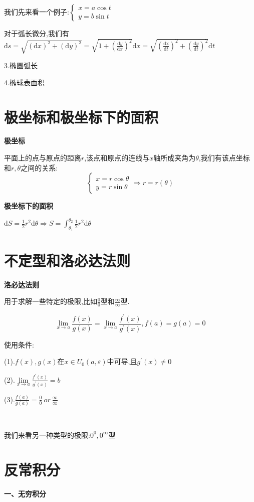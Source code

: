 \documentclass[oneside]{book}
\begin{document}
	我们先来看一个例子:$\left\{\begin{array}{c}
		x=a\cos t\\y=b\sin t
	\end{array}\right.$

	对于弧长微分,我们有$\mathrm{d}s=\sqrt{(\mathrm{d}x)^{2}+(\mathrm{d}y)^{2}}=\sqrt{1+(\frac{\mathrm{d}y}{\mathrm{d}x})^{2}}\mathrm{d}x=\sqrt{(\frac{\mathrm{dx}}{\mathrm{d}t})^{2}+(\frac{\mathrm{d}y}{\mathrm{d}t})^{2}}\mathrm{d}t$
	
	3.椭圆弧长
	
	4.椭球表面积
	
	\chapter{极坐标和极坐标下的面积}
	\textbf{极坐标}
	
	平面上的点与原点的距离$r$,该点和原点的连线与$x$轴所成夹角为$\theta$,我们有该点坐标和$r,\theta$之间的关系:
	$$\left\{\begin{array}{c}
		x=r\cos \theta\\y=r\sin \theta
	\end{array}\right.\Rightarrow r=r(\theta)$$

	\textbf{极坐标下的面积}
	
	$\mathrm{d}S=\frac{1}{2}r^{2}\mathrm{d}\theta\Rightarrow S=\int_{\theta_{1}}^{\theta_{2}}\frac{1}{2}r^{2}\mathrm{d}\theta$
	\chapter{不定型和洛必达法则}
	\textbf{洛必达法则}
	
	用于求解一些特定的极限,比如$\frac{0}{0}$型和$\frac{\infty}{\infty}$型.
	
	$$\lim\limits_{x\rightarrow a}\frac{f(x)}{g(x)}=\lim\limits_{x\rightarrow a}\frac{f^{'}(x)}{g^{'}(x)},f(a)=g(a)=0$$
	
	使用条件:
	
	(1).$f(x),g(x)$在$x\in U_{0}(a,\varepsilon)$中可导,且$g^{'}(x)\neq0$
	
	(2).$\lim\limits_{x\rightarrow a}\frac{f^{'}(x)}{g^{'}(x)}=b$
	
	(3).$\frac{f(a)}{g(a)}=\frac{0}{0}\ or \ \frac{\infty}{\infty}$
	
	\hspace{\fill}\
	
	我们来看另一种类型的极限:$0^{0},0^{\infty}$型
	\chapter{反常积分}
	\textbf{一、无穷积分}
	
\end{document}
